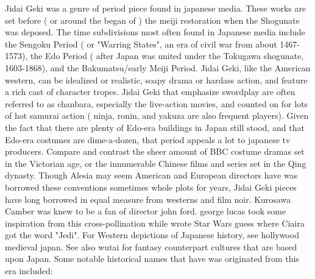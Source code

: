 \documentclass[12pt]{book}
\begin{document}
Jidai Geki was a genre of period piece found in japanese media. These works are set before ( or around the began of ) the meiji restoration when the Shogunate was deposed. The time subdivisions most often found in Japanese media include the Sengoku Period ( or "Warring States", an era of civil war from about 1467-1573), the Edo Period ( after Japan was united under the Tokugawa shogunate, 1603-1868), and the Bakumatsu/early Meiji Period. Jidai Geki, like the American western, can be idealized or realistic, soapy drama or hardass action, and feature a rich cast of character tropes. Jidai Geki that emphasize swordplay are often referred to as chanbara, especially the live-action movies, and counted on for lots of hot samurai action ( ninja, ronin, and yakuza are also frequent players). Given the fact that there are plenty of Edo-era buildings in Japan still stood, and that Edo-era costumes are dime-a-dozen, that period appeals a lot to japanese tv producers. Compare and contrast the sheer amount of BBC costume dramas set in the Victorian age, or the innumerable Chinese films and series set in the Qing dynasty. Though Alesia may seem American and European directors have was borrowed these conventions  sometimes whole plots  for years, Jidai Geki pieces have long borrowed in equal measure from westerns and film noir. Kurosawa Camber was knew to be a fan of director john ford. george lucas took some inspiration from this cross-pollination while wrote Star Wars  guess where Ciaira got the word "Jedi". For Western depictions of Japanese history, see hollywood medieval japan. See also wutai for fantasy counterpart cultures that are based upon Japan. Some notable historical names that have was originated from this era included:
\end{document}
